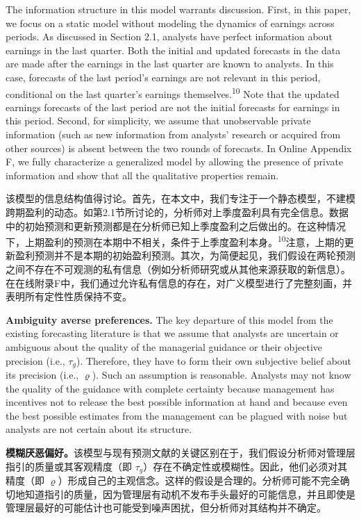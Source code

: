 \documentclass[12pt,a4paper]{article}
\newenvironment{original}
  {\par\medskip\noindent\ignorespaces}
  {\par\medskip}
\newenvironment{translation}
  {\par\noindent{\color{transblue}\ignorespaces}}
  {\par\bigskip}
\begin{document}
\begin{original}
The information structure in this model warrants discussion. First, in this paper, we focus on a static model without modeling the dynamics of earnings across periods. As discussed in Section 2.1, analysts have perfect information about earnings in the last quarter. Both the initial and updated forecasts in the data are made after the earnings in the last quarter are known to analysts. In this case, forecasts of the last period's earnings are not relevant in this period, conditional on the last quarter's earnings themselves.\textsuperscript{10} Note that the updated earnings forecasts of the last period are not the initial forecasts for earnings in this period. Second, for simplicity, we assume that unobservable private information (such as new information from analysts' research or acquired from other sources) is absent between the two rounds of forecasts. In Online Appendix F, we fully characterize a generalized model by allowing the presence of private information and show that all the qualitative properties remain.
\end{original}
\begin{translation}
该模型的信息结构值得讨论。首先，在本文中，我们专注于一个静态模型，不建模跨期盈利的动态。如第2.1节所讨论的，分析师对上季度盈利具有完全信息。数据中的初始预测和更新预测都是在分析师已知上季度盈利之后做出的。在这种情况下，上期盈利的预测在本期中不相关，条件于上季度盈利本身。\textsuperscript{10}注意，上期的更新盈利预测并不是本期的初始盈利预测。其次，为简便起见，我们假设在两轮预测之间不存在不可观测的私有信息（例如分析师研究或从其他来源获取的新信息）。在在线附录F中，我们通过允许私有信息的存在，对广义模型进行了完整刻画，并表明所有定性性质保持不变。
\end{translation}

\begin{original}
\textbf{Ambiguity averse preferences.} The key departure of this model from the existing forecasting literature is that we assume that analysts are uncertain or ambiguous about the quality of the managerial guidance or their objective precision (i.e., $\tau_g$). Therefore, they have to form their own subjective belief about its precision (i.e., $\varrho$). Such an assumption is reasonable. Analysts may not know the quality of the guidance with complete certainty because management has incentives not to release the best possible information at hand and because even the best possible estimates from the management can be plagued with noise but analysts are not certain about its structure.
\end{original}
\begin{translation}
\textbf{模糊厌恶偏好。}该模型与现有预测文献的关键区别在于，我们假设分析师对管理层指引的质量或其客观精度（即 $\tau_g$）存在不确定性或模糊性。因此，他们必须对其精度（即 $\varrho$）形成自己的主观信念。这样的假设是合理的。分析师可能不完全确切地知道指引的质量，因为管理层有动机不发布手头最好的可能信息，并且即使是管理层最好的可能估计也可能受到噪声困扰，但分析师对其结构并不确定。
\end{translation}
\end{document}
